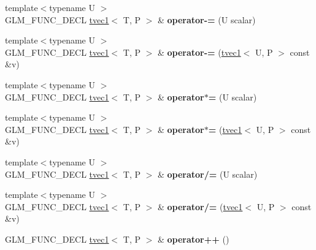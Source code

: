 \begin{DoxyCompactItemize}
{\footnotesize template$<$typename U $>$ }\\G\+L\+M\+\_\+\+F\+U\+N\+C\+\_\+\+D\+E\+CL \hyperlink{structglm_1_1tvec1}{tvec1}$<$ T, P $>$ \& {\bfseries operator-\/=} (U scalar)
\item 
\mbox{\label{structglm_1_1tvec1_ad2c5971147b89ac3a660d88296ec2a74}} 
{\footnotesize template$<$typename U $>$ }\\G\+L\+M\+\_\+\+F\+U\+N\+C\+\_\+\+D\+E\+CL \hyperlink{structglm_1_1tvec1}{tvec1}$<$ T, P $>$ \& {\bfseries operator-\/=} (\hyperlink{structglm_1_1tvec1}{tvec1}$<$ U, P $>$ const \&v)
\item 
\mbox{\label{structglm_1_1tvec1_af3f1cb98d26fa12394ed74f747170a13}} 
{\footnotesize template$<$typename U $>$ }\\G\+L\+M\+\_\+\+F\+U\+N\+C\+\_\+\+D\+E\+CL \hyperlink{structglm_1_1tvec1}{tvec1}$<$ T, P $>$ \& {\bfseries operator$\ast$=} (U scalar)
\item 
\mbox{\label{structglm_1_1tvec1_a3b881fe292b87649ebff1981800039ac}} 
{\footnotesize template$<$typename U $>$ }\\G\+L\+M\+\_\+\+F\+U\+N\+C\+\_\+\+D\+E\+CL \hyperlink{structglm_1_1tvec1}{tvec1}$<$ T, P $>$ \& {\bfseries operator$\ast$=} (\hyperlink{structglm_1_1tvec1}{tvec1}$<$ U, P $>$ const \&v)
\item 
\mbox{\label{structglm_1_1tvec1_a1790540d3ffa2385ba06a24cb02666f0}} 
{\footnotesize template$<$typename U $>$ }\\G\+L\+M\+\_\+\+F\+U\+N\+C\+\_\+\+D\+E\+CL \hyperlink{structglm_1_1tvec1}{tvec1}$<$ T, P $>$ \& {\bfseries operator/=} (U scalar)
\item 
\mbox{\label{structglm_1_1tvec1_a09ef15d7a57cbcf441eb01d3fc832b5d}} 
{\footnotesize template$<$typename U $>$ }\\G\+L\+M\+\_\+\+F\+U\+N\+C\+\_\+\+D\+E\+CL \hyperlink{structglm_1_1tvec1}{tvec1}$<$ T, P $>$ \& {\bfseries operator/=} (\hyperlink{structglm_1_1tvec1}{tvec1}$<$ U, P $>$ const \&v)
\item 
\mbox{\label{structglm_1_1tvec1_a073c75830716722cd4ffcb516788cec5}} 
G\+L\+M\+\_\+\+F\+U\+N\+C\+\_\+\+D\+E\+CL \hyperlink{structglm_1_1tvec1}{tvec1}$<$ T, P $>$ \& {\bfseries operator++} ()

\end{DoxyCompactItemize}
